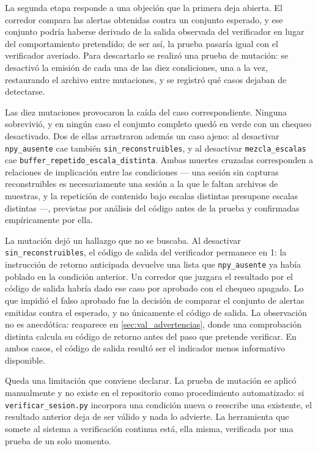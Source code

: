 La segunda etapa responde a una objeción que la primera deja abierta.
El corredor compara las alertas obtenidas contra un conjunto esperado,
y ese conjunto podría haberse derivado de la salida observada del
verificador en lugar del comportamiento pretendido; de ser así, la
prueba pasaría igual con el verificador averiado. Para descartarlo se
realizó una prueba de mutación: se desactivó la emisión de cada una de
las diez condiciones, una a la vez, restaurando el archivo entre
mutaciones, y se registró qué casos dejaban de detectarse.

Las diez mutaciones provocaron la caída del caso correspondiente.
Ninguna sobrevivió, y en ningún caso el conjunto completo quedó en
verde con un chequeo desactivado. Dos de ellas arrastraron además un
caso ajeno: al desactivar \texttt{npy\_ausente} cae también
\texttt{sin\_reconstruibles}, y al desactivar \texttt{mezcla\_escalas}
cae \texttt{buffer\_repetido\_escala\_distinta}. Ambas muertes
cruzadas corresponden a relaciones de implicación entre las
condiciones --- una sesión sin capturas reconstruibles es
necesariamente una sesión a la que le faltan archivos de muestras, y
la repetición de contenido bajo escalas distintas presupone escalas
distintas ---, previstas por análisis del código antes de la prueba y
confirmadas empíricamente por ella.

La mutación dejó un hallazgo que no se buscaba. Al desactivar
\texttt{sin\_reconstruibles}, el código de salida del verificador
permanece en 1: la instrucción de retorno anticipada devuelve una lista
que \texttt{npy\_ausente} ya había poblado en la condición anterior. Un
corredor que juzgara el resultado por el código de salida habría dado
ese caso por aprobado con el chequeo apagado. Lo que impidió el falso
aprobado fue la decisión de comparar el conjunto de alertas emitidas
contra el esperado, y no únicamente el código de salida. La
observación no es anecdótica: reaparece en
\cref{sec:val_advertencias}, donde una comprobación distinta calcula su
código de retorno antes del paso que pretende verificar. En ambos
casos, el código de salida resultó ser el indicador menos informativo
disponible.

Queda una limitación que conviene declarar. La prueba de mutación se
aplicó manualmente y no existe en el repositorio como procedimiento
automatizado: si \texttt{verificar\_sesion.py} incorpora una condición
nueva o reescribe una existente, el resultado anterior deja de ser
válido y nada lo advierte. La herramienta que somete al sistema a
verificación continua está, ella misma, verificada por una prueba de
un solo momento.
